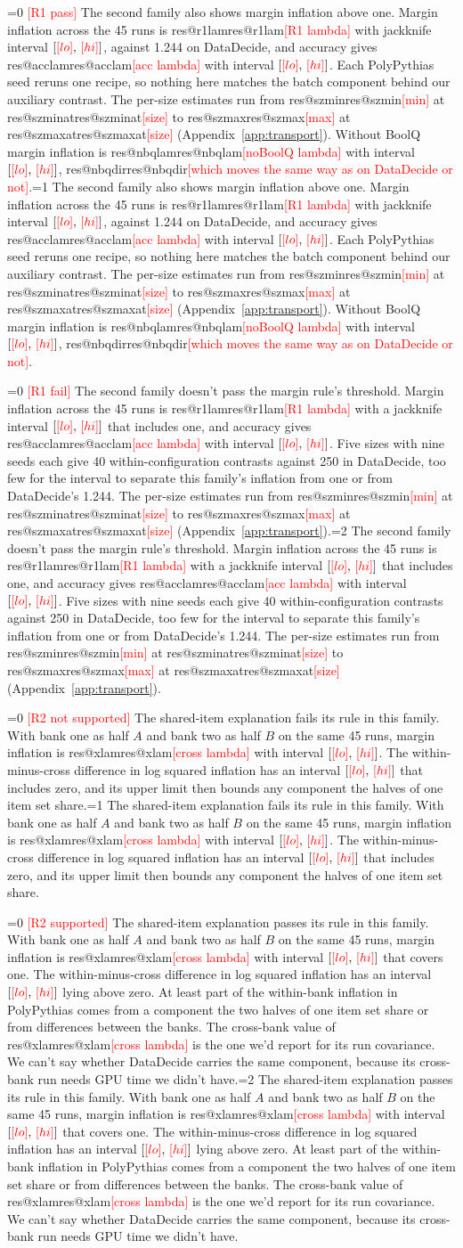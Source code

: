 \documentclass{article}
\makeatletter
\newcommand{\ci}[2]{\ensuremath{[#1,\,#2]}}
\newcommand{\pending}[1]{\textcolor{red}{[#1]}}
\newcommand{\Ronecase}{0}
\newcommand{\Rtwocase}{0}
\newcommand{\outcome}[4]{\ifnum#1=0 \pending{#3} #4\else\ifnum#1=#2 #4\fi\fi}
\newcommand{\res}[2]{\ifcsname res@#1\endcsname\csname res@#1\endcsname\else\pending{#2}\fi}
\makeatother
\begin{document}
\outcome{\Ronecase}{1}{R1 pass}{The second family also shows margin inflation above one. Margin inflation across the 45 runs is \res{r1lam}{R1 lambda} with jackknife interval \ci{\res{r1lo}{lo}}{\res{r1hi}{hi}}, against 1.244 on DataDecide, and accuracy gives \res{acclam}{acc lambda} with interval \ci{\res{acclo}{lo}}{\res{acchi}{hi}}. Each PolyPythias seed reruns one recipe, so nothing here matches the batch component behind our auxiliary contrast. The per-size estimates run from \res{szmin}{min} at \res{szminat}{size} to \res{szmax}{max} at \res{szmaxat}{size} (Appendix~\ref{app:transport}). Without BoolQ margin inflation is \res{nbqlam}{noBoolQ lambda} with interval \ci{\res{nbqlo}{lo}}{\res{nbqhi}{hi}}, \res{nbqdir}{which moves the same way as on DataDecide or not}.}

\outcome{\Ronecase}{2}{R1 fail}{The second family doesn't pass the margin rule's threshold. Margin inflation across the 45 runs is \res{r1lam}{R1 lambda} with a jackknife interval \ci{\res{r1lo}{lo}}{\res{r1hi}{hi}} that includes one, and accuracy gives \res{acclam}{acc lambda} with interval \ci{\res{acclo}{lo}}{\res{acchi}{hi}}. Five sizes with nine seeds each give 40 within-configuration contrasts against 250 in DataDecide, too few for the interval to separate this family's inflation from one or from DataDecide's 1.244. The per-size estimates run from \res{szmin}{min} at \res{szminat}{size} to \res{szmax}{max} at \res{szmaxat}{size} (Appendix~\ref{app:transport}).}

\outcome{\Rtwocase}{1}{R2 not supported}{The shared-item explanation fails its rule in this family. With bank one as half $A$ and bank two as half $B$ on the same 45 runs, margin inflation is \res{xlam}{cross lambda} with interval \ci{\res{xlo}{lo}}{\res{xhi}{hi}}. The within-minus-cross difference in log squared inflation has an interval \ci{\res{dlo}{lo}}{\res{dhi}{hi}} that includes zero, and its upper limit then bounds any component the halves of one item set share.}

\outcome{\Rtwocase}{2}{R2 supported}{The shared-item explanation passes its rule in this family. With bank one as half $A$ and bank two as half $B$ on the same 45 runs, margin inflation is \res{xlam}{cross lambda} with interval \ci{\res{xlo}{lo}}{\res{xhi}{hi}} that covers one. The within-minus-cross difference in log squared inflation has an interval \ci{\res{dlo}{lo}}{\res{dhi}{hi}} lying above zero. At least part of the within-bank inflation in PolyPythias comes from a component the two halves of one item set share or from differences between the banks. The cross-bank value of \res{xlam}{cross lambda} is the one we'd report for its run covariance. We can't say whether DataDecide carries the same component, because its cross-bank run needs GPU time we didn't have.}
\end{document}
